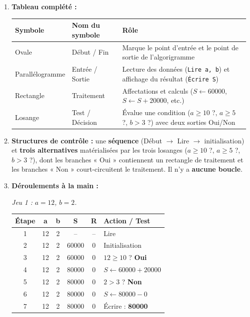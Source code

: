 \documentclass[11pt]{article}
\begin{document}
\begin{corrige}
\begin{enumerate}
\item \textbf{Tableau complété :}
\begin{center}
\begin{tabularx}{\linewidth}{|l|X|X|}
\hline
\rowcolor{popblueL} \textbf{Symbole} & \textbf{Nom du symbole} & \textbf{Rôle} \\
\hline
Ovale & Début / Fin & Marque le point d'entrée et le point de sortie de l'algorigramme \\
\hline
Parallélogramme & Entrée / Sortie & Lecture des données (\texttt{Lire a, b}) et affichage du résultat (\texttt{Écrire S}) \\
\hline
Rectangle & Traitement & Affectations et calculs ($S \leftarrow 60000$, $S \leftarrow S + 20000$, etc.) \\
\hline
Losange & Test / Décision & Évalue une condition ($a \geq 10$ ?, $a \geq 5$ ?, $b > 3$ ?) avec deux sorties Oui/Non \\
\hline
\end{tabularx}
\end{center}
\item \textbf{Structures de contrôle :} une \textbf{séquence} (Début $\to$ Lire $\to$ initialisation) et \textbf{trois alternatives} matérialisées par les trois losanges ($a \geq 10$ ?, $a \geq 5$ ?, $b > 3$ ?), dont les branches « Oui » contiennent un rectangle de traitement et les branches « Non » court-circuitent le traitement. Il n'y a \textbf{aucune boucle}.
\item \textbf{Déroulements à la main :}

\emph{Jeu 1 : $a = 12$, $b = 2$.}
\begin{center}
\begin{tabularx}{\linewidth}{|c|c|c|c|c|X|}
\hline
\rowcolor{popblueL} \textbf{Étape} & \textbf{a} & \textbf{b} & \textbf{S} & \textbf{R} & \textbf{Action / Test} \\
\hline
1 & 12 & 2 & -- & -- & Lire \\
2 & 12 & 2 & 60000 & 0 & Initialisation \\
3 & 12 & 2 & 60000 & 0 & $12 \geq 10$ ? \textbf{Oui} \\
4 & 12 & 2 & 80000 & 0 & $S \leftarrow 60000 + 20000$ \\
5 & 12 & 2 & 80000 & 0 & $2 > 3$ ? \textbf{Non} \\
6 & 12 & 2 & 80000 & 0 & $S \leftarrow 80000 - 0$ \\
7 & 12 & 2 & 80000 & 0 & Écrire : \textbf{80000} \\
\hline
\end{tabularx}
\end{center}


\end{enumerate}
\end{corrige}
\end{document}
